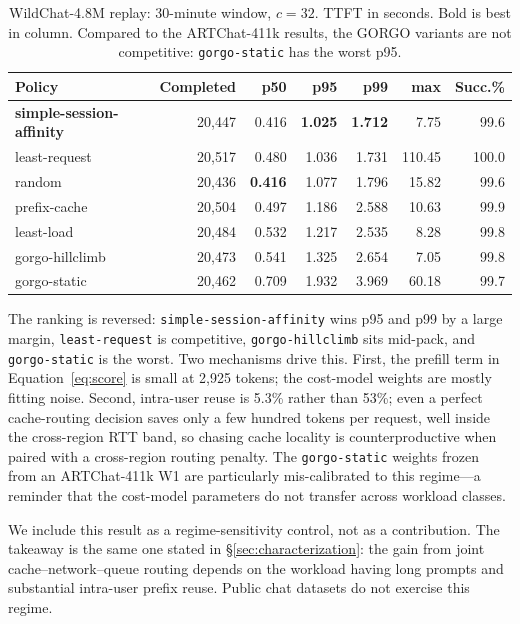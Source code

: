 \documentclass{article}
\begin{document}
\begin{table}[h]
\centering
\small
\caption{WildChat-4.8M replay: 30-minute window, $c{=}32$. TTFT in seconds.
  Bold is best in column. Compared to the ARTChat-411k results, the GORGO
  variants are not competitive: \texttt{gorgo-static} has the worst p95.}
\label{tab:wildchat}
\begin{tabular}{lrrrrrr}
\toprule
Policy & Completed & p50 & p95 & p99 & max & Succ.\% \\
\midrule
\textbf{simple-session-affinity} & 20{,}447 & 0.416 & \textbf{1.025} & \textbf{1.712} & 7.75    & 99.6 \\
least-request                    & 20{,}517 & 0.480 & 1.036          & 1.731          & 110.45  & 100.0 \\
random                           & 20{,}436 & \textbf{0.416} & 1.077 & 1.796          & 15.82   & 99.6 \\
prefix-cache                     & 20{,}504 & 0.497 & 1.186          & 2.588          & 10.63   & 99.9 \\
least-load                       & 20{,}484 & 0.532 & 1.217          & 2.535          & 8.28    & 99.8 \\
gorgo-hillclimb                  & 20{,}473 & 0.541 & 1.325          & 2.654          & 7.05    & 99.8 \\
gorgo-static                     & 20{,}462 & 0.709 & 1.932          & 3.969          & 60.18   & 99.7 \\
\bottomrule
\end{tabular}
\end{table}

The ranking is reversed: \texttt{simple-session-affinity} wins p95 and
p99 by a large margin, \texttt{least-request} is competitive,
\texttt{gorgo-hillclimb} sits mid-pack, and \texttt{gorgo-static} is the
worst. Two mechanisms drive
this. First, the prefill term in Equation~\ref{eq:score} is small at
2{,}925 tokens; the cost-model weights are mostly fitting noise.
Second, intra-user reuse is 5.3\% rather than 53\%; even a perfect
cache-routing decision saves only a few hundred tokens per request, well
inside the cross-region RTT band, so chasing cache locality is
counterproductive when paired with a cross-region routing penalty. The
\texttt{gorgo-static} weights frozen from an ARTChat-411k W1 are particularly
mis-calibrated to this regime---a reminder that the cost-model parameters
do not transfer across workload classes.

We include this result as a regime-sensitivity control, not as a
contribution. The takeaway is the same one stated in \S\ref{sec:characterization}:
the gain from joint cache--network--queue routing depends on the workload
having long prompts and substantial intra-user prefix reuse. Public chat
datasets do not exercise this regime.
\end{document}
